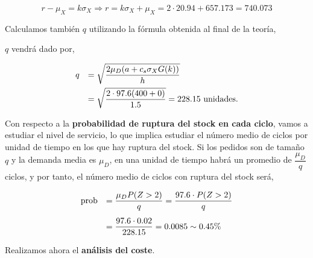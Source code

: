 \documentclass[a4paper,12pt]{article}
\begin{document}
$$ r - \mu_X = k\sigma_X \Rightarrow r = k\sigma_X + \mu_X = 2\cdot 20.94 + 657.173 = 740.073$$


Calculamos tambi\'en $q$ utilizando la f\'ormula obtenida al final de la teor\'ia,

$q$ vendr\'a dado por,

\begin{equation*}
\begin{array}{l l}
q & =  \sqrt{\dfrac{2\mu_D (a + c_s \sigma_X G(k))}{h}} \\[.3cm]
\, & = \sqrt{\dfrac{2\cdot 97.6(400 + 0)}{1.5}} = 228.15\text{ unidades.}
\end{array}
\end{equation*}

Con respecto a la \textbf{probabilidad de ruptura del stock en cada ciclo}, vamos a estudiar el nivel de servicio, lo que implica estudiar el n\'umero medio de ciclos por unidad de tiempo en los que hay ruptura del stock. Si los pedidos son de tama\~no $q$ y la demanda media es $\mu_D$, en una unidad de tiempo habr\'a un promedio de $\dfrac{\mu_D}{q}$ ciclos, y por tanto, el n\'umero medio de ciclos con ruptura del stock ser\'a,

\begin{equation*}
\begin{array}{l l}
\text{prob} & = \dfrac{\mu_D P(Z > 2)}{q} = \dfrac{97.6\cdot P(Z > 2)}{q}\\[.5cm]
\, & = \dfrac{97.6\cdot 0.02}{228.15} = 0.0085 \sim 0.45\%
\end{array}
\end{equation*}

\smallskip

Realizamos ahora el \textbf{an\'alisis del coste}. 

\end{document}
